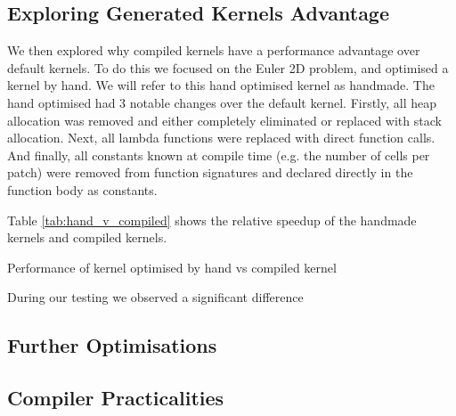 \subsection{Exploring Generated Kernels Advantage}

We then explored why compiled kernels have a performance advantage over default kernels.
To do this we focused on the Euler 2D problem, and optimised a kernel by hand.
We will refer to this hand optimised kernel as handmade.
The hand optimised had 3 notable changes over the default kernel.
Firstly, all heap allocation was removed and either completely eliminated or replaced with stack allocation.
Next, all lambda functions were replaced with direct function calls.
And finally, all constants known at compile time (e.g. the number of cells per patch) were removed from function signatures and declared directly in the function body as constants.

Table \ref{tab:hand_v_compiled} shows the relative speedup of the handmade kernels and compiled kernels.

\begin{table}
    \centering
 
\caption{Performance of kernel optimised by hand vs compiled kernel}\label{tab:hand_v_compiled}
\end{table}

During our testing we observed a significant difference

\subsection{Further Optimisations}

\subsection{Compiler Practicalities} \label{sec:practical}
